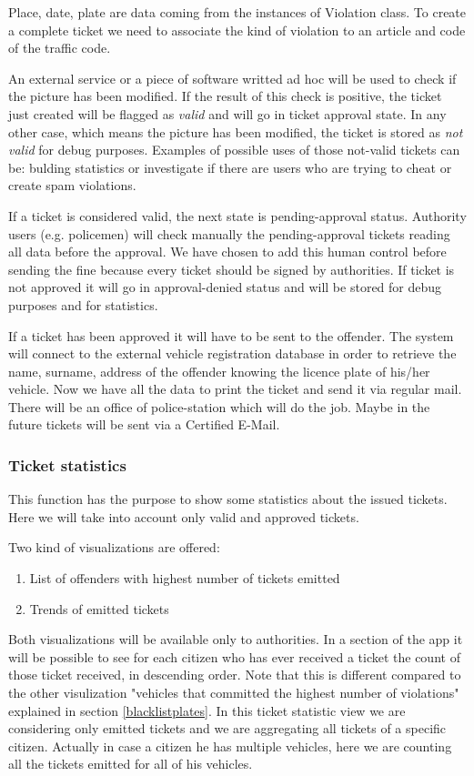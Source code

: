 Place, date, plate are data coming from the instances of Violation class. To create a complete ticket we need to associate the kind of violation to an article and code of the traffic code.

An external service or a piece of software writted ad hoc will be used to check if the picture has been modified.
If the result of this check is positive, the ticket just created will be flagged as \textit{valid} and will go in ticket approval state.
In any other case, which means the picture has been modified, the ticket is stored as \textit{not valid} for debug purposes. Examples of possible uses of those not-valid tickets can be: bulding statistics or investigate if there are users who are trying to cheat or create spam violations.

If a ticket is considered valid, the next state is pending-approval status.
Authority users (e.g. policemen) will check manually the pending-approval tickets reading all data before the approval. We have chosen to add this human control before sending the fine because every ticket should be signed by authorities. If ticket is not approved it will go in approval-denied status and will be stored for debug purposes and for statistics.

If a ticket has been approved it will have to be sent to the offender.
The system will connect to the external vehicle registration database in order to retrieve the name, surname, address of the offender knowing the licence plate of his/her vehicle.
Now we have all the data to print the ticket and send it via regular mail. There will be an office of police-station which will do the job. Maybe in the future tickets will be sent via a Certified E-Mail.

\subsubsection{Ticket statistics}
This function has the purpose to show some statistics about the issued tickets. Here we will take into account only valid and approved tickets.

Two kind of visualizations are offered:
\begin{enumerate}
  \item List of offenders with highest number of tickets emitted
  \item Trends of emitted tickets
\end{enumerate}

Both visualizations will be available only to authorities. In a section of the app it will be possible to see for each citizen who has ever received a ticket the count of those ticket received, in descending order.  Note that this is different compared to the other visulization "vehicles that committed the highest number of violations" explained in section \ref{blacklistplates}.
In this ticket statistic view we are considering only emitted tickets and we are aggregating all tickets of a specific citizen. Actually in case a citizen he has multiple vehicles, here we are counting all the tickets emitted for all of his vehicles.

